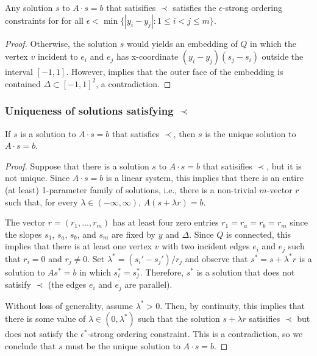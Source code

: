 \documentclass{patmorin}
\begin{document}
\begin{lem}
   Any solution $s$ to $A\cdot s=b$ that satisifies $\prec$ satisfies the
   $\epsilon$-strong ordering constraints for
   for all $\epsilon<\min\{|y_i-y_j| : 1\le i< j\le m\}$.
\end{lem}

\begin{proof}
   Otherwise, the solution $s$ would yields an embedding of $Q$ in
   which the vertex $v$ incident to $e_i$ and $e_j$ has x-coordinate
   $(y_i-y_j)(s_j-s_i)$ outside the interval $[-1,1]$. However,
    implies that the outer face of the
   embedding is contained $\Delta\subset[-1,1]^2$, a contradiction.
\end{proof}

\subsubsection{Uniqueness of solutions satisfying $\prec$}

\begin{lem}
   If $s$ is a solution to $A\cdot s=b$ that satisfies $\prec$, then $s$ is 
   the unique solution to $A\cdot s=b$.
\end{lem}

\begin{proof}
   Suppose that there is a solution $s$ to $A\cdot s=b$ that satisifies $\prec$,
   but it is not unique.  Since $A\cdot s=b$ is a linear system, this implies
   that there is an entire (at least) 1-parameter family of solutions,
   i.e., there is a non-trivial $m$-vector $r$ such that, for every
   $\lambda\in(-\infty,\infty)$, $A(s+\lambda r)=b$.

   The vector $r=(r_1,\ldots,r_m)$ has at least four zero entries
   $r_1=r_a=r_b=r_m$ since the slopes $s_1$, $s_a$, $s_b$, and $s_m$
   are fixed by $y$ and $\Delta$.  Since $Q$ is connected, this implies
   that there is at least one vertex $v$ with two incident edges $e_i$
   and $e_j$ such that $r_i=0$ and $r_j\neq 0$.  Set $\lambda^* =
   (s_i'-s_j')/r_j$ and observe that $s^*=s+\lambda^* r$ is a solution
   to $As^*=b$ in which $s_i^*=s_j^*$.  Therefore, $s^*$ is a solution that
   does not satisify $\prec$ (the edges $e_i$ and $e_j$
   are parallel).  

   Without loss of generality, assume $\lambda^* >0$. Then, by continuity,
   this implies that there is some value of $\lambda\in (0,\lambda^*)$
   such that the solution $s+\lambda r$ satisifies $\prec$ but does
   not satisfy the $\epsilon^*$-strong ordering constraint.  This is a
   contradiction, so we conclude that $s$ must be the unique solution
   to $A\cdot s=b$.
\end{proof}
\end{document}
